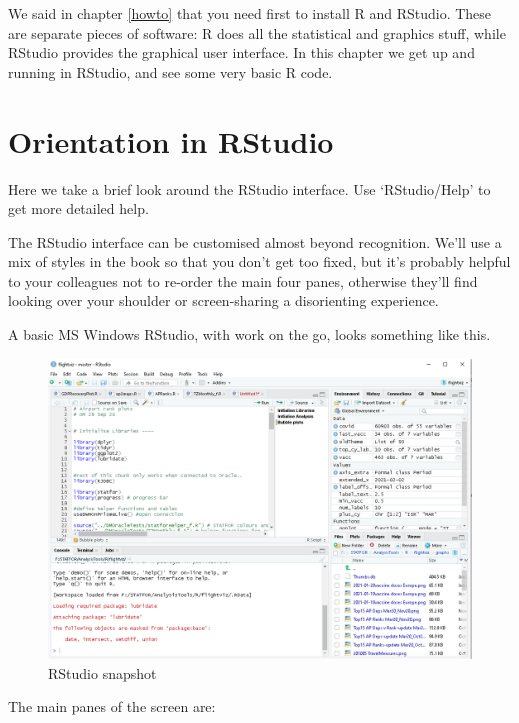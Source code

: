 \documentclass[
]{book}
\begin{document}
We said in chapter \ref{howto} that you need first to install R and RStudio. These are separate pieces of software: R does all the statistical and graphics stuff, while RStudio provides the graphical user interface. In this chapter we get up and running in RStudio, and see some very basic R code.

\hypertarget{rstudio}{%
\section{Orientation in RStudio}\label{rstudio}}

Here we take a brief look around the RStudio interface. Use `RStudio/Help' to get more detailed help.

The RStudio interface can be customised almost beyond recognition. We'll use a mix of styles in the book so that you don't get too fixed, but it's probably helpful to your colleagues not to re-order the main four panes, otherwise they'll find looking over your shoulder or screen-sharing a disorienting experience.

A basic MS Windows RStudio, with work on the go, looks something like this.

\begin{figure}
\centering
\includegraphics{images/RStudio.png}
\caption{RStudio snapshot}
\end{figure}

The main panes of the screen are:
\end{document}
